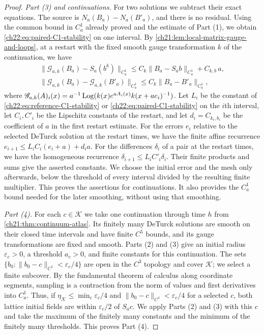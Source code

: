 \begin{proof}
\emph{Part (3) and continuations.} For two solutions we subtract their exact equations. The source is $N_a(B_a)-N_a(B'_a)$, and there is no residual. Using the common bound in $C_a^1$ already proved and the estimate of Part (1), we obtain \eqref{ch22:eq:paired-C1-stability} on one interval. By \cref{ch21:lem:local-matrix-gauge-and-loops}, at a restart with the fixed smooth gauge transformation $k$ of the continuation, we have
\[
 \begin{gathered}
 \|\mathscr G_{a,k}(B_a)-S_a(b^k)\|_{C_a^1}\le C_k\|B_a-S_ab\|_{C_a^1}+C_{k,b}\,a,\\
 \|\mathscr G_{a,k}(B_a)-\mathscr G_{a,k}(B'_a)\|_{C_a^1}\le C_k\|B_a-B'_a\|_{C_a^1},
 \end{gathered}
\]
where $\mathscr G_{a,k}(A)_i(x)=a^{-1}\operatorname{Log}(k(x)e^{aA_i(x)}k(x+ae_i)^{-1})$. Let $L_i$ be the constant of \eqref{ch22:eq:reference-C1-stability} or \eqref{ch22:eq:paired-C1-stability} on the $i$th interval, let $C_i,C'_i$ be the Lipschitz constants of the restart, and let $d_i=C_{k_i,b_i}$ be the coefficient of $a$ in the first restart estimate. For the errors $e_i$ relative to the selected DeTurck solution at the restart times, we have the finite affine recurrence $e_{i+1}\le L_iC_i(e_i+a)+d_ia$. For the differences $\delta_i$ of a pair at the restart times, we have the homogeneous recurrence $\delta_{i+1}\le L_iC'_i\delta_i$. Their finite products and sums give the asserted constants. We choose the initial error and the mesh only afterwards, below the threshold of every interval divided by the resulting finite multiplier. This proves the assertions for continuations. It also provides the $C^1_a$ bound needed for the later smoothing, without using that smoothing.

\emph{Part (4).} For each $c\in\mathscr K$ we take one continuation through time $h$ from \cref{ch21:thm:continuum-atlas}. Its finitely many DeTurck solutions are smooth on their closed time intervals and have finite $C^5$ bounds, and its gauge transformations are fixed and smooth. Parts (2) and (3) give an initial radius $\varepsilon_c>0$, a threshold $a_c>0$, and finite constants for this continuation. The sets $\{b_0:\|b_0-c\|_{C^1}<\varepsilon_c/4\}$ are open in the $C^3$ topology and cover $\mathscr K$; we select a finite subcover. By the fundamental theorem of calculus along coordinate segments, sampling is a contraction from the norm of values and first derivatives into $C_a^1$. Thus, if $\eta_{\mathscr K}\le\min_c\varepsilon_c/4$ and $\|b_0-c\|_{C^1}<\varepsilon_c/4$ for a selected $c$, both lattice initial fields are within $\varepsilon_c/2$ of $S_ac$. We apply Parts (2) and (3) with this $c$ and take the maximum of the finitely many constants and the minimum of the finitely many thresholds. This proves Part (4).
\end{proof}

